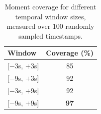 \begin{table}[h]
  \centering
  \small
  \caption{Moment coverage for different temporal window sizes, measured over 100 randomly sampled timestamps.}
  \label{tab:window_coverage}
  \begin{tabular}{lc}
    \toprule
    \textbf{Window} & \textbf{Coverage (\%)} \\
    \midrule
    {[}$-$3s, $+$3s{]}  & 85 \\
    {[}$-$9s, $+$3s{]}  & 92 \\
    {[}$-$3s, $+$9s{]}  & 92 \\
    {[}$-$9s, $+$9s{]}  & \textbf{97} \\
    \bottomrule
  \end{tabular}
  \vspace{-0.5em}
\end{table}
